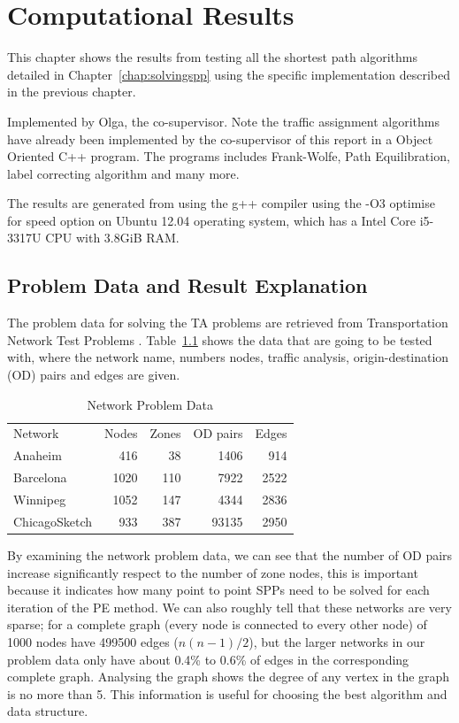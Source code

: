 \chapter{Computational Results}\label{chap:results}

This chapter shows the results from testing all the shortest path algorithms detailed in Chapter~\ref{chap:solvingspp} using the specific implementation described in the previous chapter.


Implemented by Olga, the co-supervisor.
Note the traffic assignment algorithms have already been implemented by the co-supervisor of this report in a Object Oriented C++ program.
The programs includes Frank-Wolfe, Path Equilibration,
label correcting algorithm and many more.

The results are generated from using the g++ compiler using the -O3 optimise for speed option on Ubuntu 12.04 operating system, which has a Intel Core i5-3317U CPU with 3.8GiB RAM.

\section{Problem Data and Result Explanation}
The problem data for solving the TA problems are retrieved from Transportation Network Test Problems \citep{ProblemData}.
Table~\ref{table:problemdata} shows the data that are going to be tested with,
where the network name, numbers nodes, traffic analysis, origin-destination (OD) pairs and edges are given.
\begin{table}[H]
    \centering
    \begin{tabular}{lrrrr} \toprule
        Network & Nodes & Zones & OD pairs & Edges \\ \cmidrule(lr){1-5}
        Anaheim       & 416  & 38  & 1406  & 914  \\
        Barcelona     & 1020 & 110 & 7922  & 2522 \\
        Winnipeg      & 1052 & 147 & 4344  & 2836 \\
        ChicagoSketch & 933  & 387 & 93135 & 2950 \\ \bottomrule
    \end{tabular}
    \caption{Network Problem Data}
    \label{table:problemdata}
\end{table}
By examining the network problem data,
we can see that the number of OD pairs increase
significantly respect to the number of zone nodes,
this is important because it indicates how many point to point SPPs need to be solved for each iteration of the PE method.
We can also roughly tell that these networks are very sparse;
for a complete graph (every node is connected to every other node) of 1000 nodes have 499500 edges ($n(n-1)/2$),
but the larger networks in our problem data only have about 0.4\% to 0.6\% of edges in the corresponding complete graph. 
Analysing the graph shows the degree of any vertex in the graph is no more than 5.
This information is useful for choosing the best algorithm and data structure.

